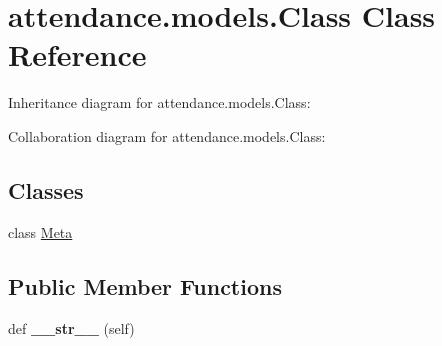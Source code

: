 \hypertarget{classattendance_1_1models_1_1_class}{}\section{attendance.\+models.\+Class Class Reference}
\label{classattendance_1_1models_1_1_class}


Inheritance diagram for attendance.\+models.\+Class\+:


Collaboration diagram for attendance.\+models.\+Class\+:
\subsection*{Classes}
\begin{DoxyCompactItemize}
\item 
class \hyperlink{classattendance_1_1models_1_1_class_1_1_meta}{Meta}
\end{DoxyCompactItemize}
\subsection*{Public Member Functions}
\begin{DoxyCompactItemize}
\item 
\hypertarget{classattendance_1_1models_1_1_class_a748ffd7424349efe2a9ffbab2ea478be}{}\label{classattendance_1_1models_1_1_class_a748ffd7424349efe2a9ffbab2ea478be} 
def {\bfseries \+\_\+\+\_\+str\+\_\+\+\_\+} (self)
\end{DoxyCompactItemize}
